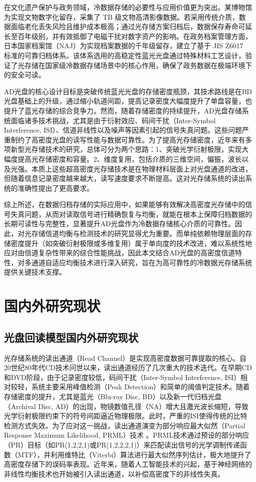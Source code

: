 在文化遗产保护与政务领域，冷数据存储的必要性与应用价值更为突出。某博物馆为实现文物数字化留存，采集了 TB 级文物高清影像数据。若采用传统介质，数据面临老化丢失风险且维护成本极高；通过光存储方案归档后，数据保存寿命可延长至百年级别，并有效抵御了电磁干扰对数字资产的影响。在政务档案管理方面，日本国家档案馆（NAJ）为实现档案数据的千年级留存，建立了基于 JIS Z6017 标准的可靠归档体系\cite{NAJ2020}。该体系选用的高稳定性蓝光光盘通过特殊材料工艺设计，验证了光存储在国家级冷数据存储场景中的核心作用，确保了政务数据在极端环境下的安全可读。

AD光盘的核心设计目标是突破传统蓝光光盘的存储密度瓶颈，其技术路线是在BD光盘基础上的升级，通过缩小轨道间距，提高记录密度大幅度提升了单盘容量，也提升了蓝光存储的综合竞争力。然而，随着存储密度的持续提升，AD光盘存储系统面临诸多技术挑战，尤其是由于衍射效应、码间干扰（Inter-Symbol Interference, ISI）、信道非线性以及噪声等因素引起的信号失真问题。这些问题严重制约了高密度光盘的读写性能与数据可靠性。为了提高光存储密度，近年来有多项新型光存储技术的研究，总体可分为两个思路：1、突破光学衍射极限，实现大幅度提高光存储密度和容量\cite{lzj2019}。2、维度复用，包括介质的三维空间，偏振，波长以及光强\cite{cwl2019}。本质上这些超高密度光存储技术是在物理材料层面上对光盘通道的改进，但随着信息记录密度越来越大，读写速度要求不断提高。这对光存储系统的读出系统的准确性提出了更高要求。

综上所述，在数据归档存储的实际应用中，如果能够有效解决高密度光存储中的信号失真问题，从而对读取信号进行精确恢复与均衡，就能在根本上保障归档数据的长期可读性与完整性，显著提升AD光盘作为冷数据存储核心介质的可靠性。因此，对光存储信道均衡与检测技术的研究显得尤为重要。而单纯依赖物理层面的存储密度提升（如突破衍射极限或多维复用）属于单向度的技术改进，难以系统性地应对由信道复杂性带来的综合性能挑战，因此本文结合AD光盘的高密度信道特性，对多通道自适应均衡技术进行深入研究，旨在为高可靠性的冷数据光存储系统提供关键技术支撑。


\section{国内外研究现状}
\subsection{光盘回读模型国内外研究现状}

光存储系统的读出通道（Read Channel）是实现高密度数据可靠提取的核心。自20世纪80年代CD技术问世以来，读出通道经历了几次重大的技术迭代。在早期CD和DVD阶段，由于记录密度较低，码间干扰（Inter-Symbol Interference, ISI）相对较轻，系统主要采用峰值检测（Peak Detection）和简单的阈值判定技术。随着存储密度的提升，尤其是蓝光（Blu-ray Disc, BD）以及新一代归档光盘（Archival Disc, AD）的出现，物镜数值孔径（NA）增大且激光波长缩短，导致光学衍射极限约束下的符号间距逼近物理极限。此时，严重的ISI使得传统的比特检测方式失效。为了应对这一挑战，读出通道演变为部分响应最大似然（Partial Response Maximum Likelihood, PRML）技术 \cite{braat2007diffractive}。PRML技术通过预设的部分响应（PR）目标（如PR(1,2,2,1)或PR(1,2,2,2,1)）来匹配读出信号的光学调制传递函数（MTF），并利用维特比（Viterbi）算法进行最大似然序列估计，极大地提升了高密度存储下的误码率表现。近年来，随着人工智能技术的兴起，基于神经网络的非线性均衡技术也开始被引入读出通道，以补偿高密度下的非线性失真。

